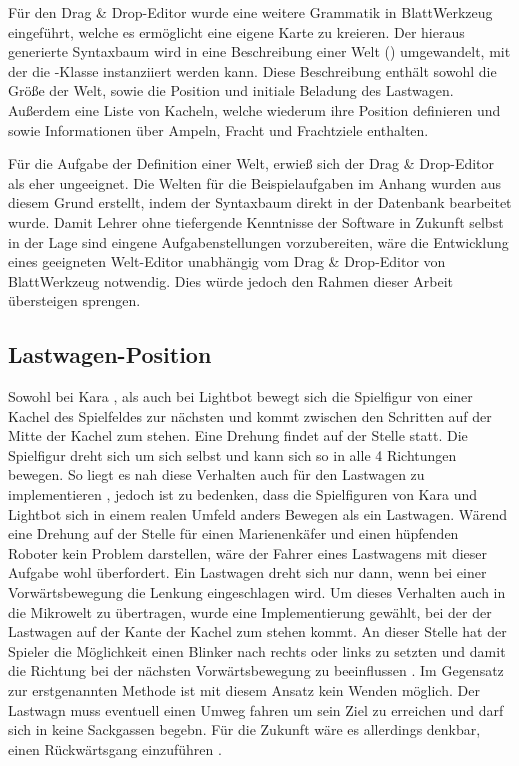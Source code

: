 Für den Drag \& Drop-Editor wurde eine weitere Grammatik in BlattWerkzeug eingeführt, welche es ermöglicht eine eigene Karte zu kreieren. Der hieraus generierte Syntaxbaum wird in eine Beschreibung einer Welt () umgewandelt, mit der die -Klasse instanziiert werden kann. Diese Beschreibung enthält sowohl die Größe der Welt, sowie die Position und initiale Beladung des Lastwagen. Außerdem eine Liste von Kacheln, welche wiederum ihre Position definieren und sowie Informationen über Ampeln, Fracht und Frachtziele enthalten.

Für die Aufgabe der Definition einer Welt, erwieß sich der Drag \& Drop-Editor als eher ungeeignet. Die Welten für die Beispielaufgaben im Anhang  wurden aus diesem Grund erstellt, indem der Syntaxbaum direkt in der Datenbank bearbeitet wurde. Damit Lehrer ohne tiefergende Kenntnisse der Software in Zukunft selbst in der Lage sind eingene Aufgabenstellungen vorzubereiten, wäre die Entwicklung eines geeigneten Welt-Editor unabhängig vom Drag \& Drop-Editor von BlattWerkzeug notwendig. Dies würde jedoch den Rahmen dieser Arbeit übersteigen sprengen.

\subsection{Lastwagen-Position}
\label{sec:implementation:rendering:truck-position}

Sowohl bei Kara , als auch bei Lightbot  bewegt sich die Spielfigur von einer Kachel des Spielfeldes zur nächsten und kommt zwischen den Schritten auf der Mitte der Kachel zum stehen. Eine Drehung findet auf der Stelle statt. Die Spielfigur dreht sich um sich selbst und kann sich so in alle 4 Richtungen bewegen. So liegt es nah diese Verhalten auch für den Lastwagen zu implementieren , jedoch ist zu bedenken, dass die Spielfiguren von Kara und Lightbot sich in einem realen Umfeld anders Bewegen als ein Lastwagen. Wärend eine Drehung auf der Stelle für einen Marienenkäfer und einen hüpfenden Roboter kein Problem darstellen, wäre der Fahrer eines Lastwagens mit dieser Aufgabe wohl überfordert. Ein Lastwagen dreht sich nur dann, wenn bei einer Vorwärtsbewegung die Lenkung eingeschlagen wird. Um dieses Verhalten auch in die Mikrowelt zu übertragen, wurde eine Implementierung gewählt, bei der der Lastwagen auf der Kante der Kachel zum stehen kommt. An dieser Stelle hat der Spieler die Möglichkeit einen Blinker nach rechts oder links zu setzten und damit die Richtung bei der nächsten Vorwärtsbewegung zu beeinflussen . Im Gegensatz zur erstgenannten Methode ist mit diesem Ansatz kein Wenden möglich. Der Lastwagn muss eventuell einen Umweg fahren um sein Ziel zu erreichen und darf sich in keine Sackgassen begebn. Für die Zukunft wäre es allerdings denkbar, einen Rückwärtsgang einzuführen .

